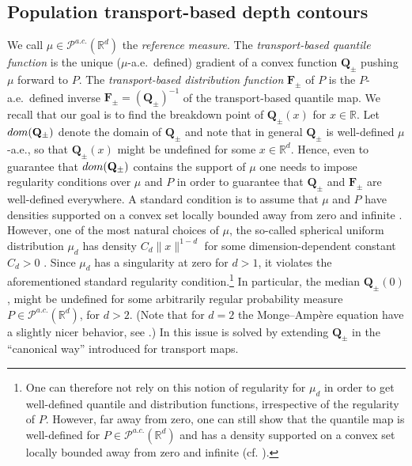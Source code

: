 \documentclass[11pt]{article}
\newcommand{\R}{\mathbb{R}}
\theoremstyle{plain}
\theoremstyle{definition}
\begin{document}
\subsection{ Population transport-based depth contours}\label{Sec:ContCOntorurs}


We call \( \mu \in \mathcal{P}^{a.c.}(\R^d)\)  the  {\it reference measure}.   The {\it transport-based quantile function} is the unique ($\mu$-a.e.\ defined) gradient of a convex function \( \mathbf{Q}_{\pm}\) pushing $\mu$ forward to $P$. The {\it transport-based distribution function} $\mathbf{F}_{ \pm }$ of $P$ is the $P$-a.e.\ defined inverse $\mathbf{F}_{ \pm } =(\mathbf{Q}_{ \pm })^{-1} $ of the transport-based quantile map. 
We recall that our goal is to find the breakdown point of  $\mathbf{Q}_{ \pm }(x)$ for $x\in \R$. Let ${\rm dom}(\mathbf{Q}_{ \pm})$ denote the domain of $\mathbf{Q}_{ \pm}$ and  note that in general  $\mathbf{Q}_{ \pm}$ is well-defined $\mu$-a.e., so that  $\mathbf{Q}_{ \pm }(x)$ might be undefined for some $x\in \R^d$.  Hence, even to guarantee that ${\rm dom}(\mathbf{Q}_{ \pm})$ contains the support of $\mu$ one needs to impose regularity conditions over $\mu$ and $P$ in order to guarantee that $\mathbf{Q}_{ \pm}$ and $\mathbf{F}_{ \pm}$ are well-defined everywhere.  A standard condition is to assume  that $\mu$ and $P$ have densities supported on a convex set locally bounded away from zero and infinite   \cite{Caffarelli.92, Figalli.17}.  However, one of the most natural choices of $\mu$, the so-called spherical uniform distribution $\mu_d$  
has  density 
$ {C_d}{\|x\|^{1-d}} $ for some dimension-dependent constant $C_d>0$ \cite{HallinDelBarrioCuestaAlbertosMatran.21}. Since $\mu_d$ 
has a singularity at zero for $d>1$, it violates the aforementioned standard regularity condition.\footnote{One can therefore not rely on this notion of regularity for $\mu_d$ in order to get well-defined quantile and distribution functions, irrespective of the regularity of $P$.  However, far away from zero, one can still show that the quantile map is well-defined for $P\in \mathcal{P}^{a.c.}(\R^d)$ and has a  density supported on a convex set locally bounded away from zero and infinite (cf. \cite{ Figalli.2018,delBarrioGonzalezHallin.2020,delBarrioGonzalezSanz.2024}). 
} In particular, the median $\mathbf{Q}_{ \pm}(0)$, might be undefined for some arbitrarily regular probability measure $P\in \mathcal{P}^{a.c.}(\R^d)$, for $d>2$. (Note that for $d=2$ the Monge–Ampère equation have a slightly nicer behavior, see \cite{Figalli.2018}.)  
In \cite{delBarriodoGonzalezSanzHallin.24} this  issue is solved by extending $\mathbf{Q}_{\pm}$ in the { ``canonical way''} introduced  for transport maps. 
\end{document}
